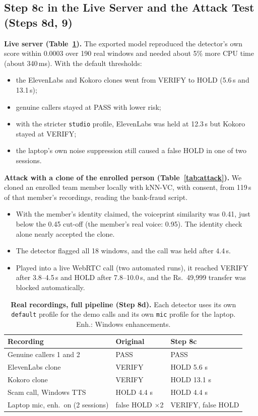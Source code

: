 \documentclass[10pt,a4paper,twocolumn]{article}
\begin{document}
\subsection{Step 8c in the Live Server and the Attack Test (Steps 8d, 9)}
\textbf{Live server (Table~\ref{tab:live8c}).} The exported model reproduced the detector's own score within 0.0003 over 190 real windows and needed about 5\% more CPU time (about 340\,ms). With the default thresholds:
\begin{itemize}\setlength\itemsep{0pt}
\item the ElevenLabs and Kokoro clones went from VERIFY to HOLD (5.6\,s and 13.1\,s);
\item genuine callers stayed at PASS with lower risk;
\item with the stricter \texttt{studio} profile, ElevenLabs was held at 12.3\,s but Kokoro stayed at VERIFY;
\item the laptop's own noise suppression still caused a false HOLD in one of two sessions.
\end{itemize}

\textbf{Attack with a clone of the enrolled person (Table~\ref{tab:attack}).} We cloned an enrolled team member locally with kNN-VC, with consent, from 119\,s of that member's recordings, reading the bank-fraud script.
\begin{itemize}\setlength\itemsep{0pt}
\item With the member's identity claimed, the voiceprint similarity was 0.41, just below the 0.45 cut-off (the member's real voice: 0.95). The identity check alone nearly accepted the clone.
\item The detector flagged all 18 windows, and the call was held after 4.4\,s.
\item Played into a live WebRTC call (two automated runs), it reached VERIFY after 3.8--4.5\,s and HOLD after 7.8--10.0\,s, and the Rs.~49,999 transfer was blocked automatically.
\end{itemize}

\begin{table}[t]
\centering\scriptsize
\caption{\textbf{Real recordings, full pipeline (Step 8d).} Each detector uses its own \texttt{default} profile for the demo calls and its own \texttt{mic} profile for the laptop. Enh.: Windows enhancements.}
\label{tab:live8c}
\setlength{\tabcolsep}{3pt}
\begin{tabular}{@{}p{}p{}p{}@{}}
\toprule
\textbf{Recording} & \textbf{Original} & \textbf{Step 8c}\\
\midrule
Genuine callers 1 and 2 & PASS & PASS\\
ElevenLabs clone & VERIFY & HOLD 5.6 s\\
Kokoro clone & VERIFY & HOLD 13.1 s\\
Scam call, Windows TTS & HOLD 4.4 s & HOLD 4.4 s\\
Laptop mic, enh.\ on (2 sessions) & false HOLD $\times$2 & VERIFY, false HOLD\\
\bottomrule
\end{tabular}
\end{table}
\end{document}
